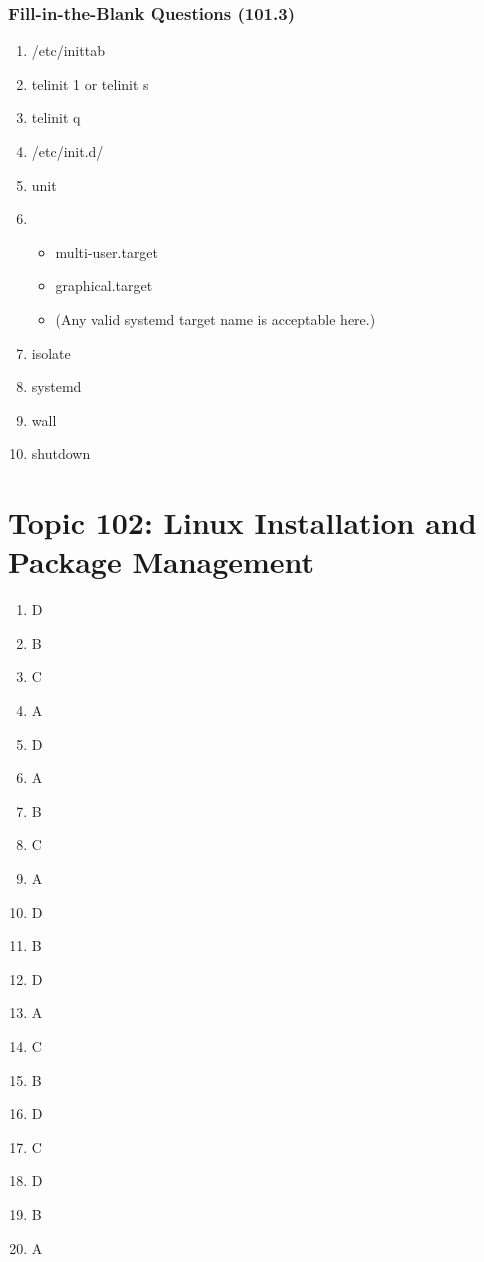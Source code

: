 \documentclass[a4paper]{report}
\begin{document}
\subsubsection*{Fill-in-the-Blank Questions (101.3)}
    \begin{enumerate}[1.]
    \item /etc/inittab
    \item telinit 1 or telinit s
    \item telinit q
    \item /etc/init.d/
    \item unit
    \item 
        \begin{itemize}
            \item multi-user.target
            \item graphical.target
            \item (Any valid systemd target name is acceptable here.)
        \end{itemize}
    \item isolate
    \item systemd
    \item wall
    \item shutdown
    \end{enumerate}


\section*{Topic 102: Linux Installation and Package Management}
\begin{enumerate}[1.]
    \item D
    \item B
    \item C
    \item A
    \item D
    \item A
    \item B
    \item C
    \item A
    \item D
    \item B
    \item D
    \item A
    \item C
    \item B
    \item D
    \item C
    \item D
    \item B
    \item A
\end{enumerate}
\end{document}
